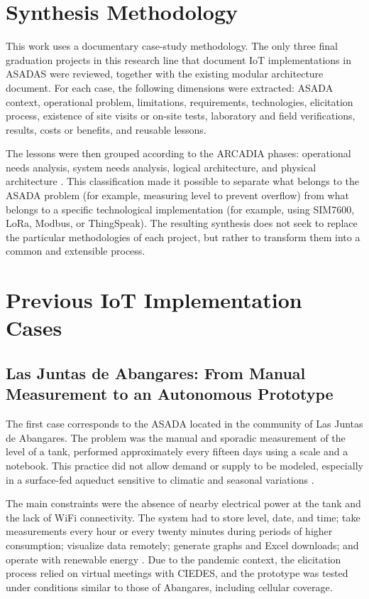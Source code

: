 \documentclass[conference]{IEEEtran}
\begin{document}
\section{Synthesis Methodology}
This work uses a documentary case-study methodology. The only three final graduation projects in this research line that document IoT implementations in ASADAS were reviewed, together with the existing modular architecture document. For each case, the following dimensions were extracted: ASADA context, operational problem, limitations, requirements, technologies, elicitation process, existence of site visits or on-site tests, laboratory and field verifications, results, costs or benefits, and reusable lessons.

The lessons were then grouped according to the ARCADIA phases: operational needs analysis, system needs analysis, logical architecture, and physical architecture \cite{arcadia,Roques2018}. This classification made it possible to separate what belongs to the ASADA problem (for example, measuring level to prevent overflow) from what belongs to a specific technological implementation (for example, using SIM7600, LoRa, Modbus, or ThingSpeak). The resulting synthesis does not seek to replace the particular methodologies of each project, but rather to transform them into a common and extensible process.

\section{Previous IoT Implementation Cases}

\subsection{Las Juntas de Abangares: From Manual Measurement to an Autonomous Prototype}
The first case corresponds to the ASADA located in the community of Las Juntas de Abangares. The problem was the manual and sporadic measurement of the level of a tank, performed approximately every fifteen days using a scale and a notebook. This practice did not allow demand or supply to be modeled, especially in a surface-fed aqueduct sensitive to climatic and seasonal variations \cite{Chavarria2021}.

The main constraints were the absence of nearby electrical power at the tank and the lack of WiFi connectivity. The system had to store level, date, and time; take measurements every hour or every twenty minutes during periods of higher consumption; visualize data remotely; generate graphs and Excel downloads; and operate with renewable energy \cite{Chavarria2021}. Due to the pandemic context, the elicitation process relied on virtual meetings with CIEDES, and the prototype was tested under conditions similar to those of Abangares, including cellular coverage.
\end{document}
